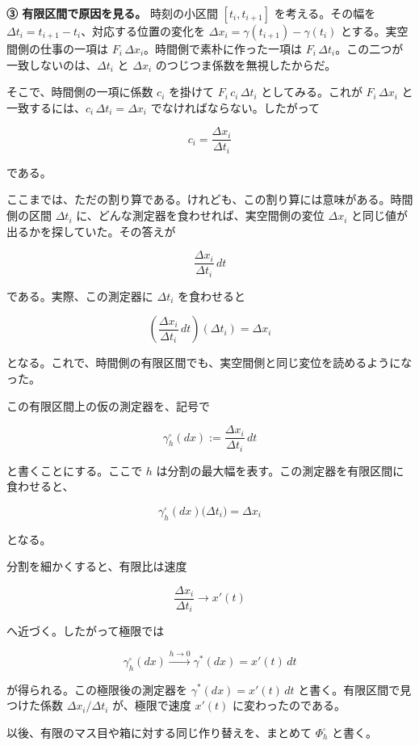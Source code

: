 \documentclass[a4paper,12pt,openany]{book}
\begin{document}
\textbf{③ 有限区間で原因を見る。} 時刻の小区間 \([t_i, t_{i+1}]\)
を考える。その幅を \(\Delta t_i = t_{i+1} - t_i\)、対応する位置の変化を
\(\Delta x_i = \gamma(t_{i+1}) - \gamma(t_i)\)
とする。実空間側の仕事の一項は
\(F_i\,\Delta x_i\)。時間側で素朴に作った一項は
\(F_i\,\Delta t_i\)。この二つが一致しないのは、\(\Delta t_i\) と
\(\Delta x_i\) のつじつま係数を無視したからだ。

そこで、時間側の一項に係数 \(c_i\) を掛けて \(F_i\,c_i\,\Delta t_i\)
としてみる。これが \(F_i\,\Delta x_i\)
と一致するには、\(c_i\,\Delta t_i = \Delta x_i\)
でなければならない。したがって

\[c_i = \frac{\Delta x_i}{\Delta t_i}\]

である。

ここまでは、ただの割り算である。けれども、この割り算には意味がある。時間側の区間
\(\Delta t_i\) に、どんな測定器を食わせれば、実空間側の変位
\(\Delta x_i\) と同じ値が出るかを探していた。その答えが

\[\frac{\Delta x_i}{\Delta t_i}\,dt\]

である。実際、この測定器に \(\Delta t_i\) を食わせると

\[\left(\frac{\Delta x_i}{\Delta t_i}\,dt\right)(\Delta t_i)=\Delta x_i\]

となる。これで、時間側の有限区間でも、実空間側と同じ変位を読めるようになった。

この有限区間上の仮の測定器を、記号で

\[\gamma_h^\square(dx):=\frac{\Delta x_i}{\Delta t_i}\,dt\]

と書くことにする。ここで \(h\)
は分割の最大幅を表す。この測定器を有限区間に食わせると、

\[\gamma_h^\square(dx)\bigl(\Delta t_i\bigr)=\Delta x_i\]

となる。

分割を細かくすると、有限比は速度

\[\frac{\Delta x_i}{\Delta t_i}\to x'(t)\]

へ近づく。したがって極限では

\[
\gamma_h^\square(dx)
\xrightarrow{h\to0}
\gamma^*(dx)
=
x'(t)\,dt
\]

が得られる。この極限後の測定器を \(\gamma^*(dx)=x'(t)\,dt\)
と書く。有限区間で見つけた係数 \(\Delta x_i/\Delta t_i\) が、極限で速度
\(x'(t)\) に変わったのである。

以後、有限のマス目や箱に対する同じ作り替えを、まとめて
\(\Phi_h^\square\) と書く。
\end{document}
